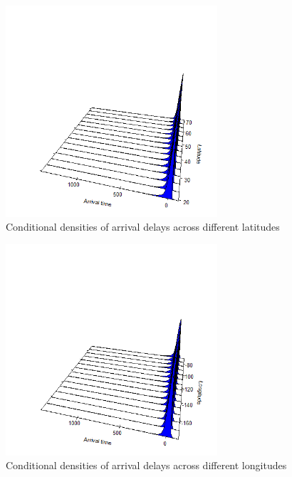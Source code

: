 \documentclass[12pt, a4paper, openany]{book}
\begin{document}
			\begin{figure}[h]
			\centering
	 		\includegraphics[width = 0.7\textwidth]{../figures/cde_latitude}
	 		\caption{Conditional densities of arrival delays across different latitudes}
	 		\end{figure}

			\begin{figure}[h]
			\centering
	 		\includegraphics[width = 0.7\textwidth]{../figures/cde_longitude}
	 		\caption{Conditional densities of arrival delays across different longitudes}
	 		\end{figure}
\end{document}
